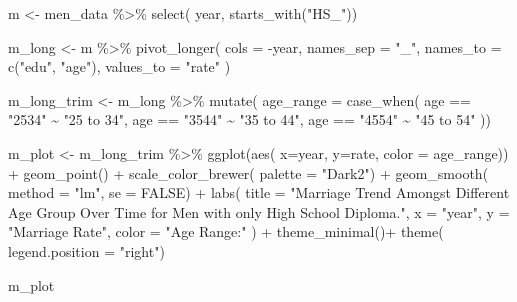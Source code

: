 \documentclass[
]{article}
\newenvironment{Shaded}{\begin{snugshade}}{\end{snugshade}}
\newcommand{\AttributeTok}[1]{\textcolor[rgb]{0.77,0.63,0.00}{#1}}
\newcommand{\ConstantTok}[1]{\textcolor[rgb]{0.00,0.00,0.00}{#1}}
\newcommand{\FunctionTok}[1]{\textcolor[rgb]{0.00,0.00,0.00}{#1}}
\newcommand{\NormalTok}[1]{#1}
\newcommand{\OtherTok}[1]{\textcolor[rgb]{0.56,0.35,0.01}{#1}}
\newcommand{\SpecialCharTok}[1]{\textcolor[rgb]{0.00,0.00,0.00}{#1}}
\newcommand{\StringTok}[1]{\textcolor[rgb]{0.31,0.60,0.02}{#1}}
\begin{document}
\begin{Shaded}
\begin{Highlighting}[]
\NormalTok{m }\OtherTok{\textless{}{-}}\NormalTok{ men\_data }\SpecialCharTok{\%\textgreater{}\%}
  \FunctionTok{select}\NormalTok{(}
\NormalTok{    year,}
    \FunctionTok{starts\_with}\NormalTok{(}\StringTok{"HS\_"}\NormalTok{)) }

\NormalTok{m\_long }\OtherTok{\textless{}{-}}\NormalTok{ m }\SpecialCharTok{\%\textgreater{}\%}
  \FunctionTok{pivot\_longer}\NormalTok{(}
  \AttributeTok{cols =} \SpecialCharTok{{-}}\NormalTok{year,}
  \AttributeTok{names\_sep =} \StringTok{"\_"}\NormalTok{,}
  \AttributeTok{names\_to =} \FunctionTok{c}\NormalTok{(}\StringTok{"edu"}\NormalTok{, }\StringTok{"age"}\NormalTok{),}
  \AttributeTok{values\_to =} \StringTok{"rate"}
\NormalTok{)}

\NormalTok{m\_long\_trim }\OtherTok{\textless{}{-}} 
\NormalTok{  m\_long }\SpecialCharTok{\%\textgreater{}\%} 
  \FunctionTok{mutate}\NormalTok{(}
    \AttributeTok{age\_range =} \FunctionTok{case\_when}\NormalTok{(}
\NormalTok{    age }\SpecialCharTok{==} \StringTok{"2534"} \SpecialCharTok{\textasciitilde{}} \StringTok{"25 to 34"}\NormalTok{,}
\NormalTok{    age }\SpecialCharTok{==} \StringTok{"3544"} \SpecialCharTok{\textasciitilde{}} \StringTok{"35 to 44"}\NormalTok{,}
\NormalTok{    age }\SpecialCharTok{==} \StringTok{"4554"} \SpecialCharTok{\textasciitilde{}} \StringTok{"45 to 54"}
\NormalTok{  ))}

\NormalTok{m\_plot }\OtherTok{\textless{}{-}}\NormalTok{ m\_long\_trim }\SpecialCharTok{\%\textgreater{}\%} 
  \FunctionTok{ggplot}\NormalTok{(}\FunctionTok{aes}\NormalTok{(}
    \AttributeTok{x=}\NormalTok{year,}
    \AttributeTok{y=}\NormalTok{rate,}
    \AttributeTok{color =}\NormalTok{ age\_range)) }\SpecialCharTok{+}
  \FunctionTok{geom\_point}\NormalTok{() }\SpecialCharTok{+}
  \FunctionTok{scale\_color\_brewer}\NormalTok{(}
    \AttributeTok{palette =} \StringTok{"Dark2"}\NormalTok{) }\SpecialCharTok{+}
  \FunctionTok{geom\_smooth}\NormalTok{(}
    \AttributeTok{method =} \StringTok{"lm"}\NormalTok{, }\AttributeTok{se =} \ConstantTok{FALSE}\NormalTok{) }\SpecialCharTok{+}
  \FunctionTok{labs}\NormalTok{(}
    \AttributeTok{title =} \StringTok{"Marriage Trend Amongst Different Age Group Over Time for Men with only High School Diploma."}\NormalTok{,}
    \AttributeTok{x =} \StringTok{"year"}\NormalTok{,}
    \AttributeTok{y =} \StringTok{"Marriage Rate"}\NormalTok{,}
    \AttributeTok{color =} \StringTok{"Age Range:"}
\NormalTok{  ) }\SpecialCharTok{+}
  \FunctionTok{theme\_minimal}\NormalTok{()}\SpecialCharTok{+}
  \FunctionTok{theme}\NormalTok{(}
    \AttributeTok{legend.position =} \StringTok{"right"}\NormalTok{)}

\NormalTok{m\_plot}
\end{Highlighting}
\end{Shaded}
\end{document}

